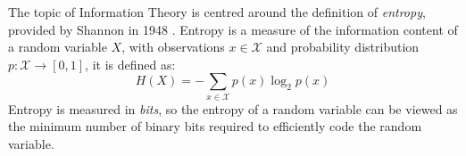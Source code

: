 The topic of Information Theory is centred around the definition of \emph{entropy}, provided by Shannon in 1948 \cite{Shannon1948a}.  Entropy is a measure of the information content of a random variable $X$, with observations $x \in \mathcal{X}$ and probability distribution $p:\mathcal{X} \rightarrow [0,1]$, it is defined as:
\begin{equation}
H(X) = -\sum_{x\in\mathcal{X}}  p(x) \log_2 p(x)
\end{equation}
Entropy is measured in \emph{bits}, so the entropy of a random variable can be viewed as the minimum number of binary bits required to efficiently code the random variable.